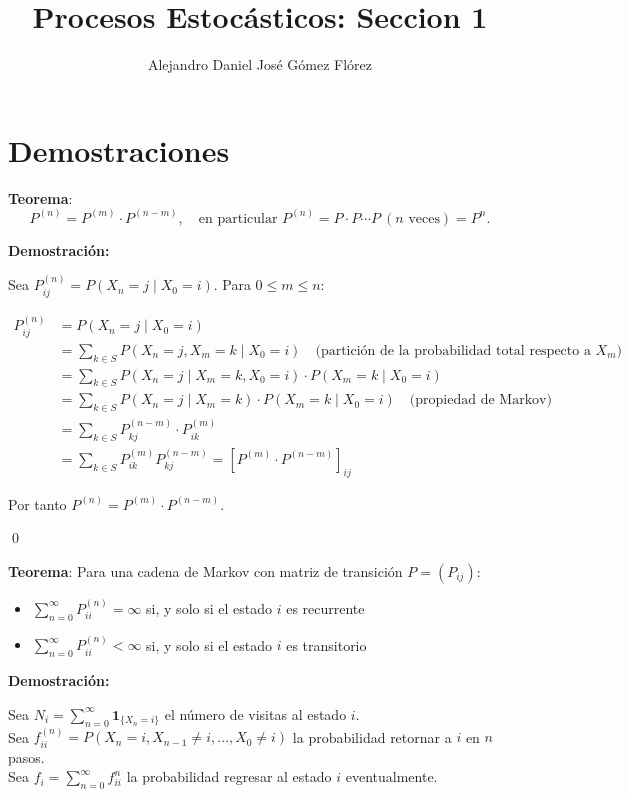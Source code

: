 \documentclass[12pt,a4paper]{article}
\title{Procesos Estocásticos: Seccion 1}
\author{Alejandro Daniel José Gómez Flórez}
\date{}
\newcommand{\teorema}[1]{%
\begin{teoremabox}
\textbf{Teorema}: #1
\end{teoremabox}
}
\begin{document}
\maketitle

\section{Demostraciones}


\teorema{
\begin{equation*}
P^{(n)} = P^{(m)} \cdot P^{(n-m)}, \quad \text{en particular } P^{(n)} = P \cdot P \cdots P \ (\text{$n$ veces}) = P^n.
\end{equation*}}

\textbf{Demostración:}

Sea $P_{ij}^{(n)} = P(X_n = j \mid X_0 = i)$. Para $0 \leq m \leq n$:

\begin{align*}
P_{ij}^{(n)} &= P(X_n = j \mid X_0 = i) \\
&= \sum_{k \in S} P(X_n = j, X_m = k \mid X_0 = i) \quad \text{(partición de la probabilidad total respecto a $X_m$)} \\
&= \sum_{k \in S} P(X_n = j \mid X_m = k, X_0 = i) \cdot P(X_m = k \mid X_0 = i) \\
&= \sum_{k \in S} P(X_n = j \mid X_m = k) \cdot P(X_m = k \mid X_0 = i) \quad \text{(propiedad de Markov)} \\
&= \sum_{k \in S} P_{kj}^{(n-m)} \cdot P_{ik}^{(m)} \\
&= \sum_{k \in S} P_{ik}^{(m)} P_{kj}^{(n-m)} = [P^{(m)} \cdot P^{(n-m)}]_{ij}
\end{align*}

Por tanto $P^{(n)} = P^{(m)} \cdot P^{(n-m)}$.

\qed


\teorema{Para una cadena de Markov con matriz de transición $P = (P_{ij})$:
\begin{itemize}
    \item $\sum_{n=0}^{\infty} P_{ii}^{(n)} = \infty$ si, y solo si el estado $i$ es recurrente
    \item $\sum_{n=0}^{\infty} P_{ii}^{(n)} < \infty$ si, y solo si el estado $i$ es transitorio
\end{itemize}}

\textbf{Demostración:}

Sea $N_i = \sum_{n=0}^{\infty} \mathbf{1}_{\{X_n = i\}}$ el número de visitas al estado $i$.\\
Sea $f^{(n)}_{ii} = P(X_n = i, X_{n-1} \neq i, \ldots, X_0 \neq i)$ la probabilidad retornar a $i$ en $n$ pasos.\\
Sea $f_{i} = \sum_{n=0}^{\infty} f^{n}_{ii}$ la probabilidad regresar al estado $i$ eventualmente.
\end{document}
